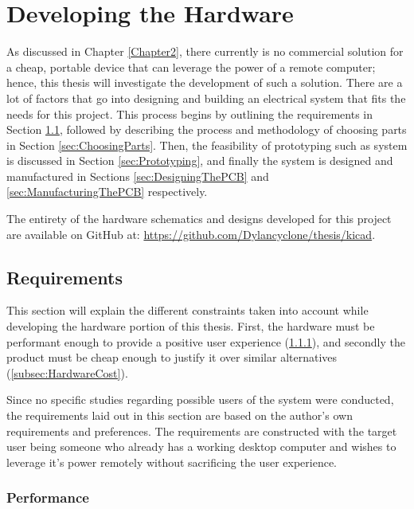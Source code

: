 \chapter{Developing the Hardware}

\label{Chapter4}

As discussed in Chapter \ref{Chapter2}, there currently is no commercial solution for a cheap, portable device that can leverage the power of a remote computer; hence, this thesis will investigate the development of such a solution.
There are a lot of factors that go into designing and building an electrical system that fits the needs for this project.
This process begins by outlining the requirements in Section \ref{sec:HardwareRequirements}, followed by describing the process and methodology of choosing parts in Section \ref{sec:ChoosingParts}.
Then, the feasibility of prototyping such as system is discussed in Section \ref{sec:Prototyping}, and finally the system is designed and manufactured in Sections \ref{sec:DesigningThePCB} and \ref{sec:ManufacturingThePCB} respectively.

The entirety of the hardware schematics and designs developed for this project are available on GitHub at: \url{https://github.com/Dylancyclone/thesis/kicad}.

\section{Requirements}\label{sec:HardwareRequirements}

This section will explain the different constraints taken into account while developing the hardware portion of this thesis.
First, the hardware must be performant enough to provide a positive user experience (\ref{subsec:HardwarePerformance}), and secondly the product must be cheap enough to justify it over similar alternatives (\ref{subsec:HardwareCost}).

Since no specific studies regarding possible users of the system were conducted, the requirements laid out in this section are based on the author's own requirements and preferences.
The requirements are constructed with the target user being someone who already has a working desktop computer and wishes to leverage it's power remotely without sacrificing the user experience.

\subsection{Performance}\label{subsec:HardwarePerformance}

